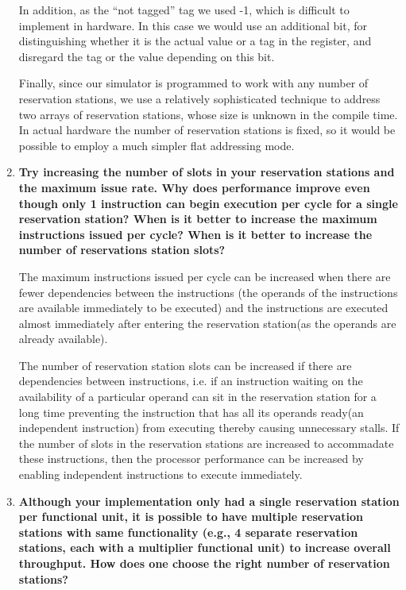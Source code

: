 \begin{enumerate}
        In addition, as the ``not tagged'' tag we used -1, which is difficult to implement in hardware. In this case we would use an additional bit, for distinguishing whether it is the actual value or a tag in the register, and disregard the tag or the value depending on this bit.
        
        Finally, since our simulator is programmed to work with any number of reservation stations, we use a relatively sophisticated technique to address two arrays of reservation stations, whose size is unknown in the compile time. In actual hardware the number of reservation stations is fixed, so it would be possible to employ a much simpler flat addressing mode.

    \item
        {\bf Try increasing the number of slots in your reservation stations and the maximum issue rate. Why does performance improve even though only 1 instruction can begin execution per cycle for a single reservation station? When is it better to increase the maximum instructions issued per cycle? When is it better to increase the number of reservations station slots?}
        
        The maximum instructions issued per cycle can be increased when there are fewer dependencies between the instructions (the operands of the instructions are available immediately to be executed) and the instructions are executed almost immediately after entering the reservation station(as the operands are already available).
        
        The number of reservation station slots can be increased if there are dependencies between instructions, i.e. if an instruction waiting on the availability of a particular operand can sit in the reservation station for a long time preventing the instruction that has all its operands ready(an independent instruction) from executing thereby causing unnecessary stalls. If the number of slots in the reservation stations are increased to accommadate these instructions, then the processor performance can be increased by enabling independent instructions to execute immediately.

    \item
        {\bf Although your implementation only had a single reservation station per functional unit, it is possible to have multiple reservation stations with same functionality (e.g., 4 separate reservation stations, each with a multiplier functional unit) to increase overall throughput. How does one choose the right number of reservation stations?}
        

\end{enumerate}

